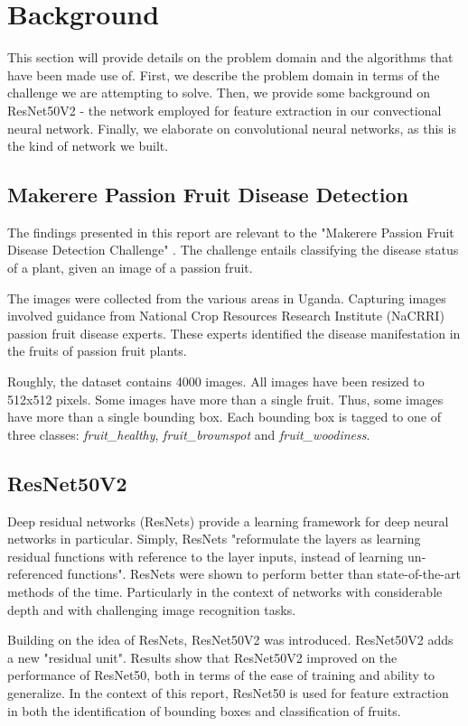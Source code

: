 \section{Background}
This section will provide details on the problem domain and the algorithms that have been made use of. First, we describe the problem domain in terms of the challenge we are attempting to solve. Then, we provide some background on ResNet50V2 \cite{ResNet50V2} - the network employed for feature extraction in our convectional neural network. Finally, we elaborate on convolutional neural networks, as this is the kind of network we built.

\subsection{Makerere Passion Fruit Disease Detection}\label{sec:domain}
The findings presented in this report are relevant to the "Makerere Passion Fruit Disease Detection Challenge" \cite{zindi}. The challenge entails classifying the disease status of a plant, given an image of a passion fruit.

The images were collected from the various areas in Uganda. Capturing images involved guidance from National Crop Resources Research Institute (NaCRRI) passion fruit disease experts. These experts identified the disease manifestation in the fruits of passion fruit plants.

Roughly, the dataset contains 4000 images. All images have been resized to 512x512 pixels. Some images have more than a single fruit. Thus, some images have more than a single bounding box. Each bounding box is tagged to one of three classes: \emph{fruit\_healthy}, \emph{fruit\_brownspot} and \emph{fruit\_woodiness}.

\subsection{ResNet50V2}
Deep residual networks (ResNets) \cite{resnet} provide a learning framework for deep neural networks in particular. Simply, ResNets "reformulate the layers as learning residual functions with reference to the layer inputs, instead of learning un-referenced functions". ResNets were shown to perform better than state-of-the-art methods of the time. Particularly in the context of networks with considerable depth and with challenging image recognition tasks.

Building on the idea of ResNets, ResNet50V2 \cite{ResNet50V2} was introduced. ResNet50V2 adds a new "residual unit". Results show that ResNet50V2 improved on the performance of ResNet50, both in terms of the ease of training and ability to generalize. In the context of this report, ResNet50 is used for feature extraction in both the identification of bounding boxes and classification of fruits.

